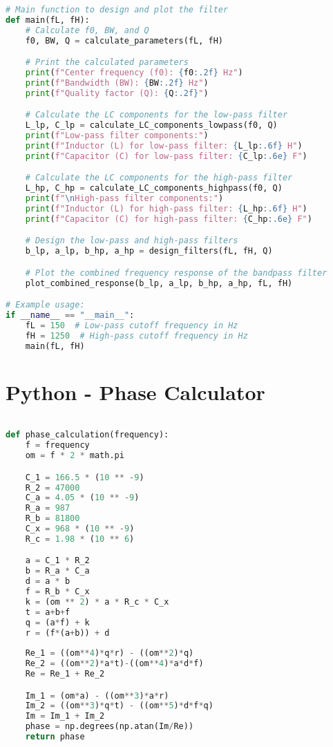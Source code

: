 \begin{lstlisting}[language=Python]
# Main function to design and plot the filter
def main(fL, fH):
    # Calculate f0, BW, and Q
    f0, BW, Q = calculate_parameters(fL, fH)

    # Print the calculated parameters
    print(f"Center frequency (f0): {f0:.2f} Hz")
    print(f"Bandwidth (BW): {BW:.2f} Hz")
    print(f"Quality factor (Q): {Q:.2f}")

    # Calculate the LC components for the low-pass filter
    L_lp, C_lp = calculate_LC_components_lowpass(f0, Q)
    print(f"Low-pass filter components:")
    print(f"Inductor (L) for low-pass filter: {L_lp:.6f} H")
    print(f"Capacitor (C) for low-pass filter: {C_lp:.6e} F")

    # Calculate the LC components for the high-pass filter
    L_hp, C_hp = calculate_LC_components_highpass(f0, Q)
    print(f"\nHigh-pass filter components:")
    print(f"Inductor (L) for high-pass filter: {L_hp:.6f} H")
    print(f"Capacitor (C) for high-pass filter: {C_hp:.6e} F")

    # Design the low-pass and high-pass filters
    b_lp, a_lp, b_hp, a_hp = design_filters(fL, fH, Q)

    # Plot the combined frequency response of the bandpass filter
    plot_combined_response(b_lp, a_lp, b_hp, a_hp, fL, fH)

# Example usage:
if __name__ == "__main__":
    fL = 150  # Low-pass cutoff frequency in Hz
    fH = 1250  # High-pass cutoff frequency in Hz
    main(fL, fH)

\end{lstlisting}


\section{Python - Phase Calculator}

\label{calculation of phase}
\begin{lstlisting}[language=Python]

def phase_calculation(frequency):
    f = frequency
    om = f * 2 * math.pi

    C_1 = 166.5 * (10 ** -9)
    R_2 = 47000
    C_a = 4.05 * (10 ** -9)
    R_a = 987
    R_b = 81800
    C_x = 968 * (10 ** -9)
    R_c = 1.98 * (10 ** 6)

    a = C_1 * R_2
    b = R_a * C_a
    d = a * b
    f = R_b * C_x
    k = (om ** 2) * a * R_c * C_x
    t = a+b+f
    q = (a*f) + k
    r = (f*(a+b)) + d
    
    Re_1 = ((om**4)*q*r) - ((om**2)*q)
    Re_2 = ((om**2)*a*t)-((om**4)*a*d*f)
    Re = Re_1 + Re_2

    Im_1 = (om*a) - ((om**3)*a*r)
    Im_2 = ((om**3)*q*t) - ((om**5)*d*f*q)
    Im = Im_1 + Im_2
    phase = np.degrees(np.atan(Im/Re))
    return phase

\end{lstlisting}
\newpage
